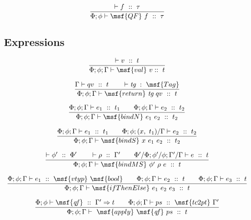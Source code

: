 \documentclass{article}
\begin{document}
\begin{gather}
\frac{ \vdash f \ :: \ \tau}{ \Phi; \phi \vdash \msf{QF} \ f \ :: \ \tau}
\end{gather}



\subsection{Expressions}

\begin{gather}
\frac{ \vdash v \ :: \ t}{\Phi; \phi; \Gamma \vdash \msf{val} \ v ::
  \ t}
\end{gather}

\begin{gather}
  \frac{ \Gamma \vdash qv \ :: \ t \qquad \vdash \mbox{\it tg} \ :
    \ \msf{Tag} } {\Phi; \phi; \Gamma \vdash \msf{return} \ \mbox{\it
      tg} \ qv \ :: \ t}
\end{gather}

\begin{gather}
 \frac{\Phi; \phi; \Gamma \vdash e_1 \ :: \ t_1 \qquad \Phi; \phi;
   \Gamma \vdash e_2 \ :: \ t_2} {\Phi; \phi; \Gamma \vdash
   \msf{bindN} \ e_1 \ e_2 \ :: \ t_2 }
\end{gather}

\begin{gather}
 \frac{\Phi; \phi; \Gamma \vdash e_1 \ :: \ t_1 \qquad \Phi; \phi; (x,
   \ t_1) / \Gamma \vdash e_2 \ :: \ t_2} {\Phi; \phi; \Gamma \vdash
   \msf{bindS} \ x \ e_1 \ e_2 \ :: \ t_2 }
\end{gather}

\begin{gather}
  \frac{ \vdash \phi' \ :: \ \Phi' \qquad \vdash \rho \ :: \ \Gamma'
    \qquad \Phi' / \Phi; \phi' / \phi; \Gamma' / \Gamma \vdash e \ ::
    \ t} {\Phi; \phi; \Gamma \vdash \msf{bindMS} \ \phi' \ \rho \ e
    \ :: \ t }
\end{gather}

\begin{gather}
  \frac{\Phi; \phi; \Gamma \vdash e_1 \ :: \ \msf{vtyp} \ \msf{bool}
    \qquad \Phi; \phi; \Gamma \vdash e_2 \ :: \ t \qquad \Phi; \phi;
    \Gamma \vdash e_3 \ :: \ t } {\Phi; \phi; \Gamma \vdash
    \msf{ifThenElse} \ e_1 \ e_2 \ e_3 \ :: \ t }
\end{gather}

\begin{gather}
\frac{ \Phi; \phi \vdash \msf{\it qf} \ :: \ \Gamma' \Rightarrow t
  \qquad \Phi; \phi; \Gamma \vdash ps \ :: \ \msf{tc2pt}
  \ \Gamma'}{\Phi; \phi; \Gamma \vdash \ \msf{apply} \ \msf{\it qf}
  \ ps \ :: \ t}
\end{gather}
\end{document}
